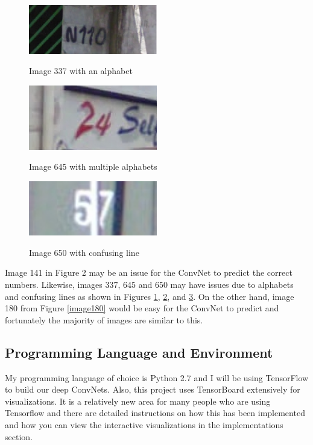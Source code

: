 \documentclass[twoside, column]{article}
\begin{document}
\begin{figure}
\caption{Image 337 with an alphabet}
\centering
\includegraphics[width=0.5\textwidth]{337_alphabets}
\label{image337}
\end{figure}

\begin{figure}
\caption{Image 645 with multiple alphabets}
\centering
\includegraphics[width=0.5\textwidth]{645_alphabets}
\label{image645}
\end{figure}

\begin{figure}
\caption{Image 650 with confusing line}
\centering
\includegraphics[width=0.5\textwidth]{650_confusing}
\label{image650}
\end{figure}

Image 141 in Figure 2 may be an issue for the ConvNet to predict the correct numbers.  Likewise, images 337, 645 and 650 may have issues due to alphabets and confusing lines as shown in Figures \ref{image337}, \ref{image645}, and \ref{image650}. On the other hand, image 180 from Figure \ref{image180} would be easy for the ConvNet to predict and fortunately the majority of images are similar to this. 

\subsection{Programming Language and Environment}

My programming language of choice is Python 2.7 and I will be using TensorFlow to build our deep ConvNets. Also, this project uses TensorBoard extensively for visualizations. It is a relatively new area for many people who are using Tensorflow and there are detailed instructions on how this has been implemented and how you can view the interactive visualizations in the implementations section.
\end{document}
